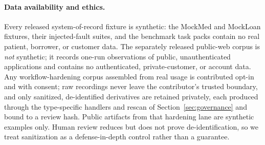 \paragraph{Data availability and ethics.}
Every released system-of-record fixture is synthetic: the MockMed and MockLoan
fixtures, their injected-fault suites, and the benchmark task packs contain no
real patient, borrower, or customer data. The separately released public-web
corpus is \emph{not} synthetic; it records one-run observations of public,
unauthenticated applications and contains no authenticated, private-customer, or
account data. Any workflow-hardening corpus assembled from real usage is
contributed opt-in and with consent; raw recordings never leave the contributor's
trusted boundary, and only sanitized, de-identified derivatives are retained
privately, each produced through the type-specific handlers and rescan of
Section~\ref{sec:governance} and bound to a review hash. Public artifacts from
that hardening lane are synthetic examples only. Human review reduces but does
not prove de-identification, so we treat sanitization as a defense-in-depth
control rather than a guarantee.
